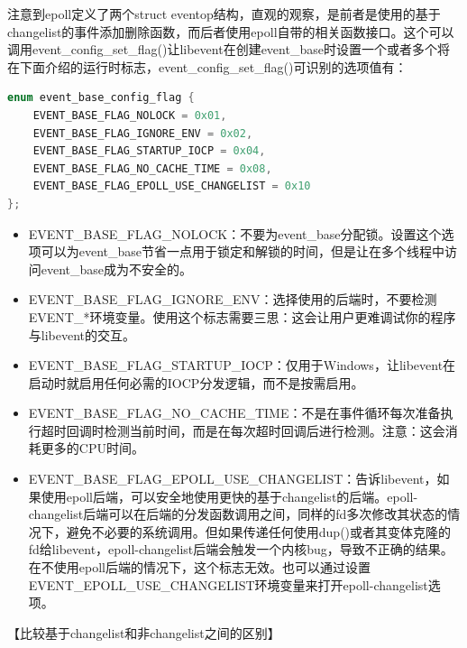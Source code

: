 \documentclass[11pt,a4paper]{article}
\begin{document}
注意到epoll定义了两个struct eventop结构，直观的观察，是前者是使用的基于changelist的事件添加删除函数，而后者使用epoll自带的相关函数接口。这个可以调用event\_config\_set\_flag()让libevent在创建event\_base时设置一个或者多个将在下面介绍的运行时标志，event\_config\_set\_flag()可识别的选项值有：
\begin{lstlisting}[language=C]
enum event_base_config_flag {
	EVENT_BASE_FLAG_NOLOCK = 0x01,
	EVENT_BASE_FLAG_IGNORE_ENV = 0x02,
	EVENT_BASE_FLAG_STARTUP_IOCP = 0x04,
	EVENT_BASE_FLAG_NO_CACHE_TIME = 0x08,
	EVENT_BASE_FLAG_EPOLL_USE_CHANGELIST = 0x10
};
\end{lstlisting}
\begin{itemize}
\item EVENT\_BASE\_FLAG\_NOLOCK：不要为event\_base分配锁。设置这个选项可以为event\_base节省一点用于锁定和解锁的时间，但是让在多个线程中访问event\_base成为不安全的。
\item EVENT\_BASE\_FLAG\_IGNORE\_ENV：选择使用的后端时，不要检测EVENT\_*环境变量。使用这个标志需要三思：这会让用户更难调试你的程序与libevent的交互。
\item EVENT\_BASE\_FLAG\_STARTUP\_IOCP：仅用于Windows，让libevent在启动时就启用任何必需的IOCP分发逻辑，而不是按需启用。
\item EVENT\_BASE\_FLAG\_NO\_CACHE\_TIME：不是在事件循环每次准备执行超时回调时检测当前时间，而是在每次超时回调后进行检测。注意：这会消耗更多的CPU时间。
\item EVENT\_BASE\_FLAG\_EPOLL\_USE\_CHANGELIST：告诉libevent，如果使用epoll后端，可以安全地使用更快的基于changelist的后端。epoll-changelist后端可以在后端的分发函数调用之间，同样的fd多次修改其状态的情况下，避免不必要的系统调用。但如果传递任何使用dup()或者其变体克隆的fd给libevent，epoll-changelist后端会触发一个内核bug，导致不正确的结果。在不使用epoll后端的情况下，这个标志无效。也可以通过设置EVENT\_EPOLL\_USE\_CHANGELIST环境变量来打开epoll-changelist选项。
\end{itemize}

【比较基于changelist和非changelist之间的区别】
\end{document}
